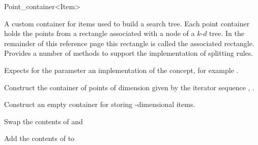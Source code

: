 

\begin{ccRefClass}{Point_container<Item>}  %






\ccDefinition
A custom container for items used to build a search tree. Each point container
holds the points from a rectangle associated with a node of a $k$-$d$ tree.
In the remainder of this reference page this rectangle is called the
associated rectangle.
Provides a number of methods
to support the implementation of splitting rules.


\ccParameters

Expects for the parameter  an implementation of the
 concept, for example .

\ccTypes



\ccCreation
{}

{
Construct the container of points of dimension 
given by the iterator sequence , .
}

{
Construct an empty container for storing -dimensional items.
}


{Swap the contents of  and }

{Add the contents of  to }


\end{ccRefClass}
